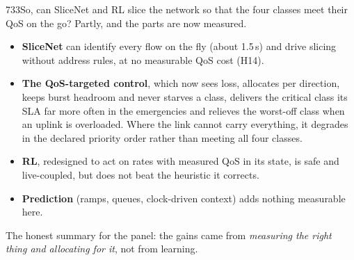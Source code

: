 \begin{qa}{733}{So, can SliceNet and RL slice the network so that the four classes meet their QoS on the go?}
Partly, and the parts are now measured.
\begin{itemize}
\item \textbf{SliceNet} can identify every flow on the fly (about 1.5\,s) and drive slicing without address rules, at no
measurable QoS cost (H14).
\item \textbf{The QoS-targeted control}, which now sees loss, allocates per direction, keeps burst headroom and never
starves a class, delivers the critical class its SLA far more often in the emergencies and relieves the worst-off class
when an uplink is overloaded. Where the link cannot carry everything, it degrades in the declared priority order rather
than meeting all four classes.
\item \textbf{RL}, redesigned to act on rates with measured QoS in its state, is safe and live-coupled, but does not
beat the heuristic it corrects.
\item \textbf{Prediction} (ramps, queues, clock-driven context) adds nothing measurable here.
\end{itemize}
The honest summary for the panel: the gains came from \emph{measuring the right thing and allocating for it}, not from
learning.
\end{qa}
